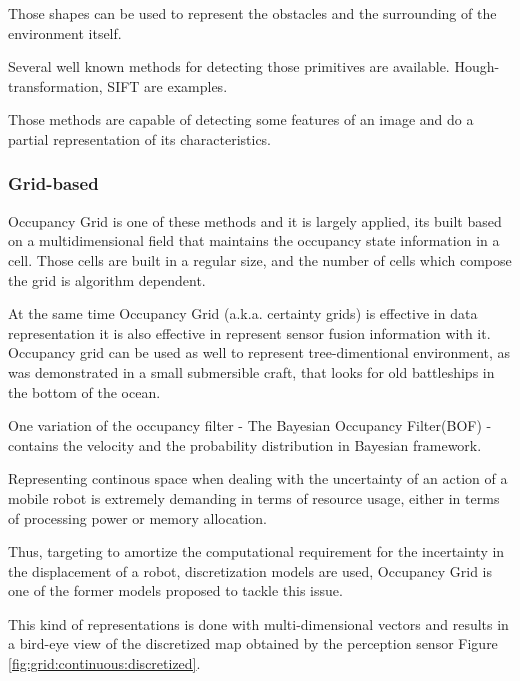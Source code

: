 Those shapes can be used to represent the obstacles and the surrounding of the environment itself.

Several well known methods for detecting those primitives are available. Hough-transformation, SIFT are examples.

Those methods are capable of detecting some features of an image and do a partial representation of its characteristics.

\subsubsection{Grid-based}

Occupancy Grid is one of these methods and it is largely applied, its built based on a multidimensional field that maintains the occupancy state information in a cell\cite{Elfes:1989:UOG:68491.68495}. Those cells are built in a regular size, and the number of cells which compose the grid is algorithm dependent.

At the same time Occupancy Grid (a.k.a. certainty grids) is effective in data representation it is also effective in represent sensor fusion information with it. Occupancy grid can be used as well to represent tree-dimentional environment, as was demonstrated in a small submersible craft, that looks for old battleships in the bottom of the ocean\cite{DBLP:journals/aim/Moravec88}.

One variation of the occupancy filter - The Bayesian Occupancy Filter(BOF) - contains the velocity and the probability distribution in Bayesian framework.

Representing continous space when dealing with the uncertainty of an action of a mobile robot is extremely demanding in terms of resource usage, either in terms of processing power or memory allocation.

Thus, targeting to amortize the computational requirement for the incertainty in the displacement of a robot, discretization models are used, Occupancy Grid\cite{Elfes:1989:UOG:68491.68495} is one of the former models proposed to tackle this issue.

This kind of representations is done with multi-dimensional vectors and results in a bird-eye view of the discretized map obtained by the perception sensor Figure \ref{fig:grid:continuous:discretized}.


